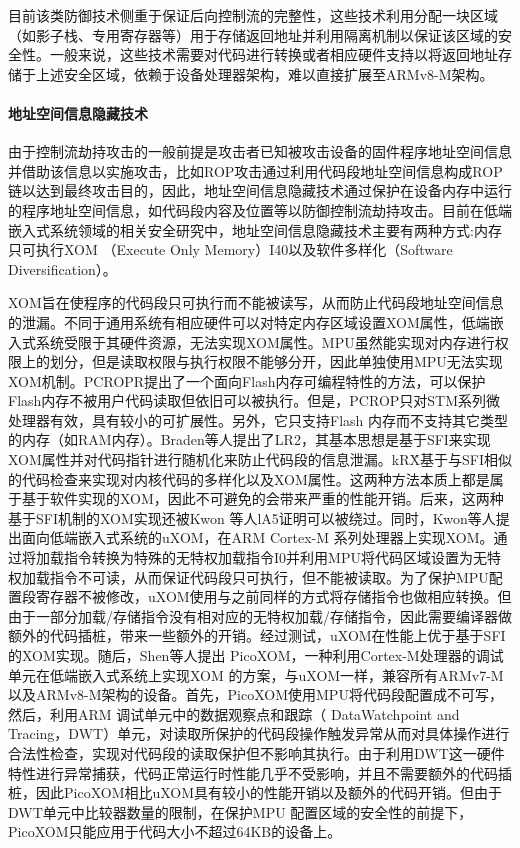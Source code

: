 \documentclass[12pt,a4paper]{ctexart}
\begin{document}
\par 目前该类防御技术侧重于保证后向控制流的完整性，这些技术利用分配一块区域（如影子栈、专用寄存器等）用于存储返回地址并利用隔离机制以保证该区域的安全性。一般来说，这些技术需要对代码进行转换或者相应硬件支持以将返回地址存储于上述安全区域，依赖于设备处理器架构，难以直接扩展至ARMv8-M架构。\\
\paragraph{地址空间信息隐藏技术}
\par 由于控制流劫持攻击的一般前提是攻击者已知被攻击设备的固件程序地址空间信息并借助该信息以实施攻击，比如ROP攻击通过利用代码段地址空间信息构成ROP链以达到最终攻击目的，因此，地址空间信息隐藏技术通过保护在设备内存中运行的程序地址空间信息，如代码段内容及位置等以防御控制流劫持攻击。目前在低端嵌入式系统领域的相关安全研究中，地址空间信息隐藏技术主要有两种方式:内存只可执行XOM （Execute Only Memory）I40以及软件多样化（Software Diversification）。
\par XOM旨在使程序的代码段只可执行而不能被读写，从而防止代码段地址空间信息的泄漏。不同于通用系统有相应硬件可以对特定内存区域设置XOM属性，低端嵌入式系统受限于其硬件资源，无法实现XOM属性。MPU虽然能实现对内存进行权限上的划分，但是读取权限与执行权限不能够分开，因此单独使用MPU无法实现XOM机制。PCROPR提出了一个面向Flash内存可编程特性的方法，可以保护Flash内存不被用户代码读取但依旧可以被执行。但是，PCROP只对STM系列微处理器有效，具有较小的可扩展性。另外，它只支持Flash 内存而不支持其它类型的内存（如RAM内存）。Braden等人提出了LR2，其基本思想是基于SFI来实现XOM属性并对代码指针进行随机化来防止代码段的信息泄漏。kR\^X基于与SFI相似的代码检查来实现对内核代码的多样化以及XOM属性。这两种方法本质上都是属于基于软件实现的XOM，因此不可避免的会带来严重的性能开销。后来，这两种基于SFI机制的XOM实现还被Kwon 等人lA5证明可以被绕过。同时，Kwon等人提出面向低端嵌入式系统的uXOM，在ARM Cortex-M 系列处理器上实现XOM。通过将加载指令转换为特殊的无特权加载指令I0并利用MPU将代码区域设置为无特权加载指令不可读，从而保证代码段只可执行，但不能被读取。为了保护MPU配置段寄存器不被修改，uXOM使用与之前同样的方式将存储指令也做相应转换。但由于一部分加载/存储指令没有相对应的无特权加载/存储指令，因此需要编译器做额外的代码插桩，带来一些额外的开销。经过测试，uXOM在性能上优于基于SFI的XOM实现。随后，Shen等人提出 PicoXOM，一种利用Cortex-M处理器的调试单元在低端嵌入式系统上实现XOM 的方案，与uXOM一样，兼容所有ARMv7-M 以及ARMv8-M架构的设备。首先，PicoXOM使用MPU将代码段配置成不可写，然后，利用ARM 调试单元中的数据观察点和跟踪（ DataWatchpoint and Tracing，DWT）单元，对读取所保护的代码段操作触发异常从而对具体操作进行合法性检查，实现对代码段的读取保护但不影响其执行。由于利用DWT这一硬件特性进行异常捕获，代码正常运行时性能几乎不受影响，并且不需要额外的代码插桩，因此PicoXOM相比uXOM具有较小的性能开销以及额外的代码开销。但由于DWT单元中比较器数量的限制，在保护MPU 配置区域的安全性的前提下，PicoXOM只能应用于代码大小不超过64KB的设备上。
\end{document}
